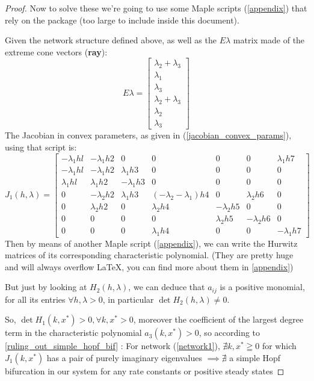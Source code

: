 \begin{proof}
	Now to solve these we're going to use some Maple scripts (\ref{appendix}) that rely on the \cite{franz2016ConvexMaple} package (too large to include inside this document).

	Given the network structure defined above, as well as the $E\lambda$ matrix made of the extreme cone vectors (\textbf{ray}):
	\[
		E\lambda =
		\begin{bmatrix}
			\lambda_2 + \lambda_3 \\
			\lambda_1 \\
			\lambda_3 \\
			\lambda_2 + \lambda_3 \\
			\lambda_2 \\
			\lambda_3
		\end{bmatrix}
	\]
	The Jacobian in convex parameters, as given in (\ref{jacobian_convex_params}), using that script is:
	\[
		\left. J_1(h,\lambda)=
		\left[
			\begin{array}{ccccccc}-\lambda_1hl&-\lambda_1h2&0&0&0&0&\lambda_1h7\\-\lambda_1hl&-\lambda_1h2&\lambda_1h3&0&0&0&0\\\lambda_1hl&\lambda_1h2&-\lambda_1h3&0&0&0&0\\0&-\lambda_2h2&\lambda_1h3&(-\lambda_2-\lambda_1)h4&0&\lambda_2h6&0\\0&\lambda_2h2&0&\lambda_2h4&-\lambda_2h5&0&0\\0&0&0&0&\lambda_2h5&-\lambda_2h6&0\\0&0&0&\lambda_1h4&0&0&-\lambda_1h7
		\end{array}\right.\right]
	\]
	Then by means of another Maple script (\ref{appendix}), we can write the Hurwitz matrices of its corresponding characteristic polynomial. (They are pretty huge and will always overflow \LaTeX, you can find more about them in \ref{appendix})

	But just by looking at $H_2(h,\lambda)$, we can deduce that $a_{ij}$ is a positive monomial, for all  its entries $\forall h , \lambda > 0$, in particular $\det H_2(h, \lambda) \neq 0$.

	So, $\det H_1(k,x^*) > 0, \forall k, x^* > 0$, moreover the coefficient of the largest degree term in the characteristic polynomial $a_3(k, x^*) > 0$, so according to \ref{ruling_out_simple_hopf_bif} : For network (\ref{network1}), $\nexists k, x^* \geqq 0$ for which $J_1(k,x^*)$ has a pair of purely imaginary eigenvalues $\implies \nexists$ a simple Hopf bifurcation in our system for any rate constants or positive steady states
\end{proof}

